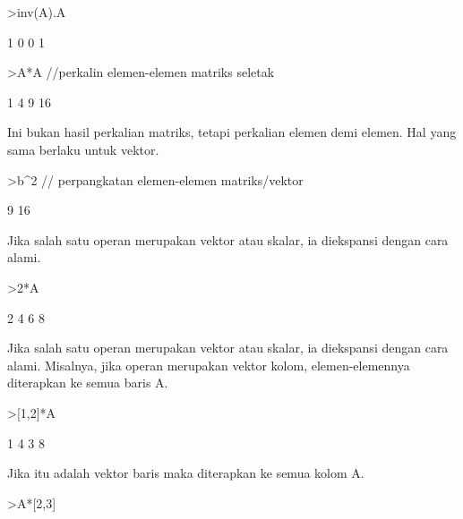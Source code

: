 \documentclass[a4paper,10pt]{article}
\begin{document}
\begin{eulernotebook}
\begin{eulercomment}
\begin{eulercomment}
\begin{eulercomment}
\begin{eulercomment}
\begin{eulercomment}
\begin{eulercomment}
\begin{eulerprompt}
>inv(A).A
\end{eulerprompt}
\begin{euleroutput}
              1             0 
              0             1 
\end{euleroutput}
\begin{eulerprompt}
>A*A //perkalin elemen-elemen matriks seletak
\end{eulerprompt}
\begin{euleroutput}
              1             4 
              9            16 
\end{euleroutput}
\begin{eulercomment}
Ini bukan hasil perkalian matriks, tetapi perkalian elemen demi
elemen. Hal yang sama berlaku untuk vektor.
\end{eulercomment}
\begin{eulerprompt}
>b^2 // perpangkatan elemen-elemen matriks/vektor
\end{eulerprompt}
\begin{euleroutput}
              9 
             16 
\end{euleroutput}
\begin{eulercomment}
Jika salah satu operan merupakan vektor atau skalar, ia diekspansi
dengan cara alami.
\end{eulercomment}
\begin{eulerprompt}
>2*A
\end{eulerprompt}
\begin{euleroutput}
              2             4 
              6             8 
\end{euleroutput}
\begin{eulercomment}
Jika salah satu operan merupakan vektor atau skalar, ia diekspansi
dengan cara alami. Misalnya, jika operan merupakan vektor kolom,
elemen-elemennya diterapkan ke semua baris A.
\end{eulercomment}
\begin{eulerprompt}
>[1,2]*A
\end{eulerprompt}
\begin{euleroutput}
              1             4 
              3             8 
\end{euleroutput}
\begin{eulercomment}
Jika itu adalah vektor baris maka diterapkan ke semua kolom A.
\end{eulercomment}
\begin{eulerprompt}
>A*[2,3]
\end{eulerprompt}

\end{eulercomment}
\end{eulercomment}
\end{eulercomment}
\end{eulercomment}
\end{eulercomment}
\end{eulercomment}
\end{eulernotebook}
\end{document}
